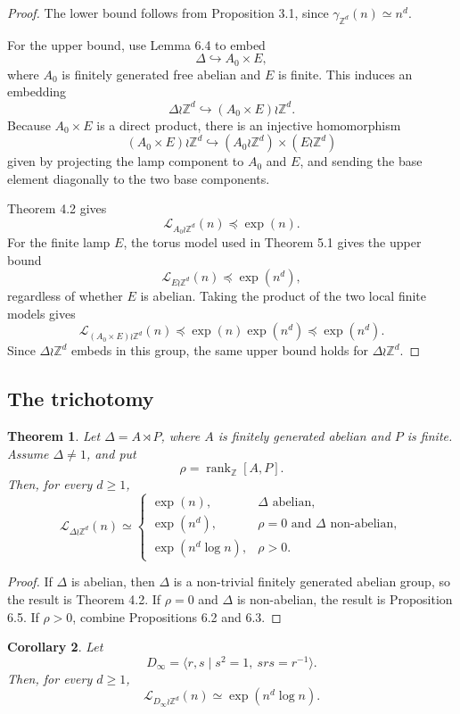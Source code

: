 \documentclass[11pt]{article}
\newcommand{\LEF}{\mathcal L}
\newcommand{\Z}{\mathbb Z}
\newcommand{\rank}{\operatorname{rank}}
\newtheorem{theorem}{Theorem}[section]
\newtheorem{corollary}[theorem]{Corollary}
\begin{document}
\begin{proof}
The lower bound follows from Proposition 3.1, since \(\gamma_{\Z^d}(n)\simeq n^d\).

For the upper bound, use Lemma 6.4 to embed
\[
\Delta\hookrightarrow A_0\times E,
\]
where \(A_0\) is finitely generated free abelian and \(E\) is finite. This induces an embedding
\[
\Delta\wr\Z^d\hookrightarrow (A_0\times E)\wr\Z^d.
\]
Because \(A_0\times E\) is a direct product, there is an injective homomorphism
\[
(A_0\times E)\wr\Z^d\hookrightarrow (A_0\wr\Z^d)\times(E\wr\Z^d)
\]
given by projecting the lamp component to \(A_0\) and \(E\), and sending the base element diagonally to the two base components.

Theorem 4.2 gives
\[
\LEF_{A_0\wr\Z^d}(n)\preceq \exp(n).
\]
For the finite lamp \(E\), the torus model used in Theorem 5.1 gives the upper bound
\[
\LEF_{E\wr\Z^d}(n)\preceq \exp(n^d),
\]
regardless of whether \(E\) is abelian. Taking the product of the two local finite models gives
\[
\LEF_{(A_0\times E)\wr\Z^d}(n)\preceq \exp(n)\exp(n^d)\preceq \exp(n^d).
\]
Since \(\Delta\wr\Z^d\) embeds in this group, the same upper bound holds for \(\Delta\wr\Z^d\).
\end{proof}

\subsection{The trichotomy}

\begin{theorem}
Let \(\Delta=A\rtimes P\), where \(A\) is finitely generated abelian and \(P\) is finite. Assume \(\Delta\neq 1\), and put
\[
\rho=\rank_\Z[A,P].
\]
Then, for every \(d\ge 1\),
\[
\LEF_{\Delta\wr\Z^d}(n)\simeq
\begin{cases}
\exp(n), & \Delta\text{ abelian},\\
\exp(n^d), & \rho=0\text{ and }\Delta\text{ non-abelian},\\
\exp(n^d\log n), & \rho>0.
\end{cases}
\]
\end{theorem}

\begin{proof}
If \(\Delta\) is abelian, then \(\Delta\) is a non-trivial finitely generated abelian group, so the result is Theorem 4.2. If \(\rho=0\) and \(\Delta\) is non-abelian, the result is Proposition 6.5. If \(\rho>0\), combine Propositions 6.2 and 6.3.
\end{proof}

\begin{corollary}
Let
\[
D_\infty=\langle r,s\mid s^2=1,\ srs=r^{-1}\rangle.
\]
Then, for every \(d\ge 1\),
\[
\LEF_{D_\infty\wr\Z^d}(n)\simeq \exp(n^d\log n).
\]
\end{corollary}
\end{document}
